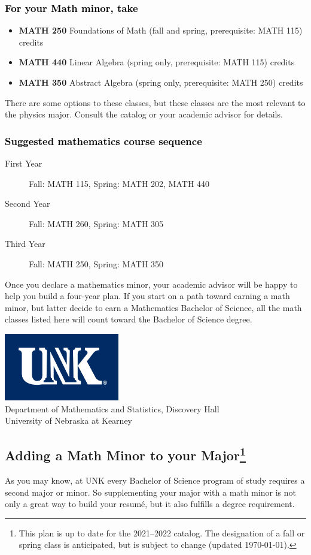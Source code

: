 \documentclass[10pt]{article}
\newcommand{\foundations}{\textbf{MATH 250} Foundations of Math (fall and spring, prerequisite: MATH 115)  \dotfill 3 credits}
\newcommand{\linear}{\textbf{MATH 440} Linear Algebra (spring only, prerequisite: MATH 115) \dotfill 3 credits}
\newcommand{\abstractalgebra}{\textbf{MATH 350}	Abstract Algebra (spring only, prerequisite: MATH 250) \dotfill 	3 credits}
\newcommand{\catalog}{2021--2022 }
\newcommand{\myfootnote}{\footnote{This plan is up to date for  the \catalog catalog. The designation of a fall or spring class is 
anticipated, but  is subject to change (updated  \today).}}
\newcommand{\myheading}{
\begin{flushleft}
\includegraphics[scale=0.35]{unk-logo}\\
\setcounter{footnote}{0}
\vspace{0.25in}
 \textcolor{unkblue}{Department of Mathematics and Statistics, Discovery Hall} \\
  \textcolor{unkblue}{University of Nebraska at Kearney}
\end{flushleft}}
\begin{document}
\subsubsection*{\textcolor{black}{For your Math minor, take}}
\begin{itemize}
\item \foundations
\item \linear
\item \abstractalgebra
\end{itemize}
There are some options to these classes, but these classes are the most relevant to the physics major. Consult the catalog or your academic
advisor for details.

\subsubsection*{\textcolor{black}{Suggested mathematics course sequence}}

\begin{description}
   \item[\phantom{xxx} First Year] Fall: MATH 115, Spring:  MATH 202, MATH 440
      \item[\phantom{xxx} Second Year]  Fall: MATH 260,  Spring: MATH 305
     \item[\phantom{xxx} Third Year]  Fall: MATH 250,  Spring: MATH 350
  \end{description}
  \vspace{0.1in}
  

 \noindent Once you declare a mathematics minor, your academic advisor will be happy to help you build a four-year plan. If you start on a path toward earning a math minor, but latter decide to earn a  Mathematics Bachelor of Science, all the math classes listed here will count toward the Bachelor of Science degree.




\newpage

\myheading

\subsection*{\textbf{\textcolor{unkblue}{Adding a Math Minor to your Major\myfootnote}}}

As you may know, at UNK every Bachelor of Science program of study requires a second
major or minor. So supplementing your major with a math minor is not only a great
way to build your resum\'e, but it also fulfills a degree requirement.
\end{document}
